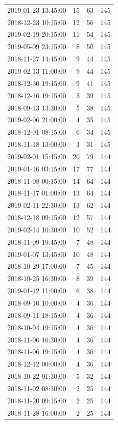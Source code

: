 \begin{tabular}{lrrr}
2019-01-23 13:45:00 & 15 & 63 & 145 \\
2018-12-23 10:15:00 & 12 & 56 & 145 \\
2019-02-19 20:15:00 & 11 & 54 & 145 \\
2019-05-09 23:15:00 & 8 & 50 & 145 \\
2018-11-27 14:45:00 & 9 & 44 & 145 \\
2019-02-13 11:00:00 & 9 & 44 & 145 \\
2018-12-30 19:45:00 & 9 & 41 & 145 \\
2018-12-16 19:15:00 & 5 & 39 & 145 \\
2018-09-13 13:30:00 & 5 & 38 & 145 \\
2019-02-06 21:00:00 & 4 & 35 & 145 \\
2018-12-01 08:15:00 & 6 & 34 & 145 \\
2018-11-18 13:00:00 & 3 & 31 & 145 \\
2019-02-01 15:45:00 & 20 & 79 & 144 \\
2019-01-16 03:15:00 & 17 & 77 & 144 \\
2018-11-08 00:15:00 & 14 & 64 & 144 \\
2018-11-17 01:00:00 & 13 & 64 & 144 \\
2019-02-11 22:30:00 & 13 & 62 & 144 \\
2018-12-18 09:15:00 & 12 & 57 & 144 \\
2019-02-14 16:30:00 & 10 & 52 & 144 \\
2018-11-09 19:45:00 & 7 & 48 & 144 \\
2019-01-07 13:45:00 & 10 & 48 & 144 \\
2018-10-29 17:00:00 & 7 & 45 & 144 \\
2018-10-25 16:30:00 & 8 & 39 & 144 \\
2019-01-12 11:00:00 & 6 & 38 & 144 \\
2018-09-10 10:00:00 & 4 & 36 & 144 \\
2018-09-11 18:15:00 & 4 & 36 & 144 \\
2018-10-04 19:15:00 & 4 & 36 & 144 \\
2018-11-06 16:30:00 & 4 & 36 & 144 \\
2018-11-06 19:15:00 & 4 & 36 & 144 \\
2018-12-12 00:00:00 & 4 & 36 & 144 \\
2018-10-22 01:30:00 & 5 & 32 & 144 \\
2018-11-02 08:30:00 & 2 & 25 & 144 \\
2018-11-20 09:15:00 & 2 & 25 & 144 \\
2018-11-28 16:00:00 & 2 & 25 & 144 \\

\end{tabular}
